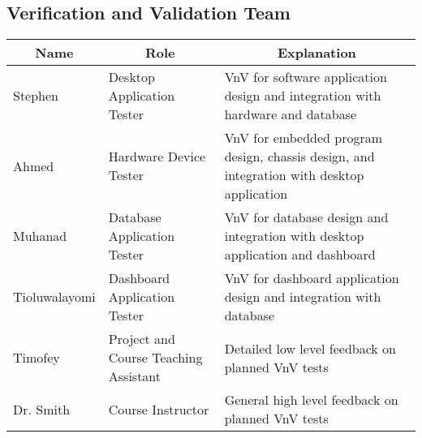 \documentclass[12pt, titlepage]{article}
\begin{document}
\subsection{Verification and Validation Team}


  \begin{table}[H]
    \centering
    \begin{tabular}{|p{3cm}|p{4cm}|p{7cm}|}
    \hline
    \multicolumn{1}{|c|}{\textbf{Name}} & \multicolumn{1}{|c|}{\textbf{Role}} & \multicolumn{1}{|c|}{\textbf{Explanation}}
    \\ \hline
    Stephen
    & Desktop Application Tester
    & VnV for software application design and integration with hardware and database
    \newline                                
    \\ \hline
  
    Ahmed                              
    & Hardware Device Tester
    & VnV for embedded program design, chassis design, and integration with desktop application
    \newline                                
    \\ \hline
  
    Muhanad                          
    & Database Application Tester
    & VnV for database design and integration with desktop application and dashboard
    \newline                                
    \\ \hline
  
    Tioluwalayomi                                
    & Dashboard Application Tester
    & VnV for dashboard application design and integration with database
    \newline                            
    \\ \hline

    Timofey                                
    & Project and Course Teaching Assistant
    & Detailed low level feedback on planned VnV tests
    \newline                            
    \\ \hline
  
    Dr. Smith                                
    & Course Instructor
    & General high level feedback on planned VnV tests 
    \newline                            
    \\ \hline
  
    \end{tabular}
  \end{table}
  \newpage
\end{document}
